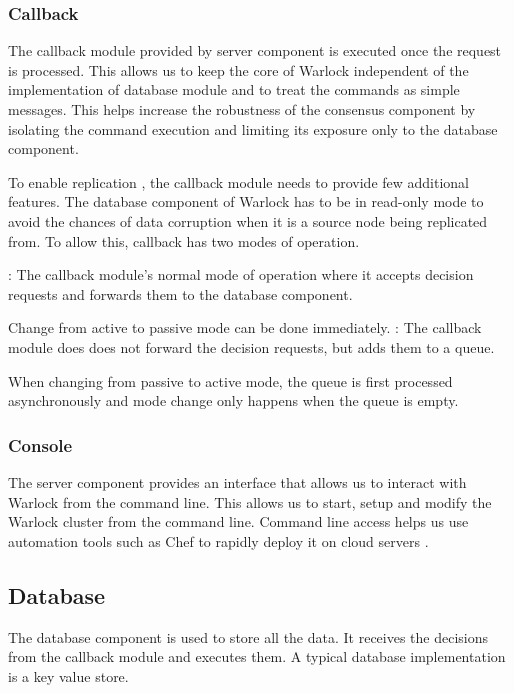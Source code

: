 \subsubsection{Callback}

The callback module provided by server component is executed once the request is
processed. This allows us to keep the core of Warlock independent of the
implementation of database module and to treat the commands as simple messages.
This helps increase the robustness of the consensus component by isolating the
command execution and limiting its exposure only to the database component.

To enable replication , the
callback module needs to provide few additional features. The database
component of Warlock has to be in read-only mode to avoid the chances of
data corruption when it is a source node being replicated from. To allow
this, callback has two modes of operation.

\begin{enumerate}
    : The callback module's normal mode of operation where it
    accepts decision requests and forwards them to the database component.

    Change from active to passive mode can be done immediately.
    : The callback module does does not forward the decision
    requests, but adds them to a queue.

    When changing from passive to active mode, the queue is first processed
    asynchronously and mode change only happens when the queue is empty.
\end{enumerate}

\subsubsection{Console}

The server component provides an interface that allows us to interact with
Warlock from the command line. This allows us to start, setup and modify the
Warlock cluster from the command line. Command line access helps us use
automation tools such as Chef \citep{Chef} to rapidly deploy it on cloud servers
\citep{Armbrust:2010:VCC:1721654.1721672, amazonAWS}.

\subsection{Database}

The database component is used to store all the data. It receives the
decisions from the callback module and executes them. A typical database
implementation is a key value store.

